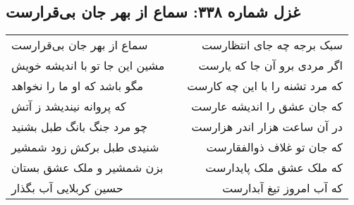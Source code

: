 \begin{center}
\section*{غزل شماره ۳۳۸: سماع از بهر جان بی‌قرارست}
\label{sec:0338}
\begin{longtable}{l p{0.5cm} r}
سماع از بهر جان بی‌قرارست
&&
سبک برجه چه جای انتظارست
\\
مشین این جا تو با اندیشه خویش
&&
اگر مردی برو آن جا که یارست
\\
مگو باشد که او ما را نخواهد
&&
که مرد تشنه را با این چه کارست
\\
که پروانه نیندیشد ز آتش
&&
که جان عشق را اندیشه عارست
\\
چو مرد جنگ بانگ طبل بشنید
&&
در آن ساعت هزار اندر هزارست
\\
شنیدی طبل برکش زود شمشیر
&&
که جان تو غلاف ذوالفقارست
\\
بزن شمشیر و ملک عشق بستان
&&
که ملک عشق ملک پایدارست
\\
حسین کربلایی آب بگذار
&&
که آب امروز تیغ آبدارست
\\
\end{longtable}
\end{center}
